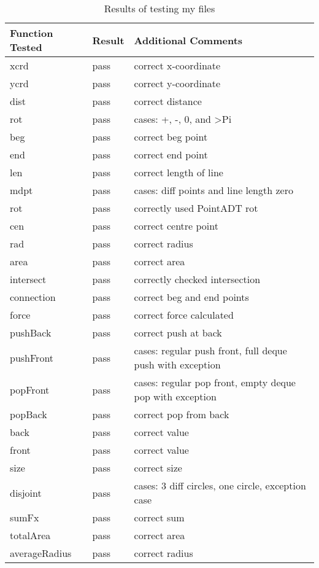 \documentclass[12pt]{article}
\begin{document}
\begin{table}[h]
	\centering
	\begin{tabularx}{\linewidth}{ l|l|X }
		\toprule
		Function Tested & Result & Additional Comments\\
		\midrule
		xcrd & pass & correct x-coordinate\\
		ycrd & pass & correct y-coordinate\\
		dist & pass & correct distance\\
		rot & pass & cases: +, -, 0, and >Pi\\
		beg & pass & correct beg point\\
		end & pass & correct end point\\
		len & pass & correct length of line\\
		mdpt & pass & cases: diff points and line length zero\\
		rot & pass & correctly used PointADT rot\\
		cen & pass &  correct centre point\\
		rad & pass & correct radius\\
		area & pass & correct area\\
		intersect & pass & correctly checked intersection\\
		connection & pass & correct beg and end points\\
		force & pass & correct force calculated\\
		pushBack & pass & correct push at back\\
		pushFront & pass & cases: regular push front, full deque push with exception\\
		popFront & pass & cases: regular pop front, empty deque pop with exception\\
		popBack & pass & correct pop from back\\
		back & pass & correct value\\
		front & pass & correct value\\
		size & pass & correct size\\
		disjoint & pass & cases: 3 diff circles, one circle, exception case\\
		sumFx & pass & correct sum\\
		totalArea & pass & correct area\\
		averageRadius &  pass & correct radius\\

		\bottomrule
	\end{tabularx}
	\caption{Results of testing my files}
	\label{Table : Results of testing my files}
\end{table}
\end{document}
